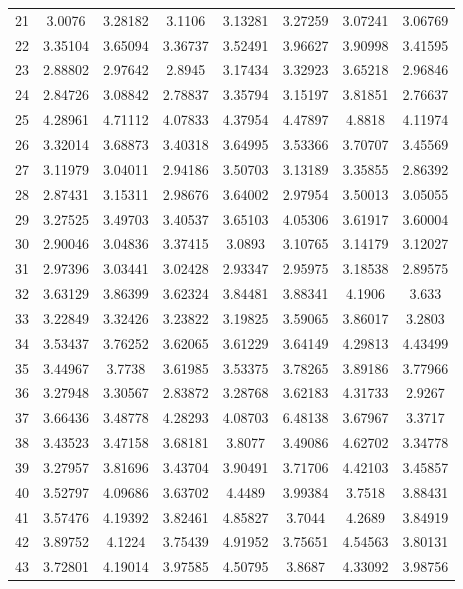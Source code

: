 \begin{figure}
\begin{tabular}{cccccccc}
21 & 3.0076 & 3.28182 & 3.1106 & 3.13281 & 3.27259 & 3.07241 & 3.06769\\
22 & 3.35104 & 3.65094 & 3.36737 & 3.52491 & 3.96627 & 3.90998 & 3.41595\\
23 & 2.88802 & 2.97642 & 2.8945 & 3.17434 & 3.32923 & 3.65218 & 2.96846\\
24 & 2.84726 & 3.08842 & 2.78837 & 3.35794 & 3.15197 & 3.81851 & 2.76637\\
25 & 4.28961 & 4.71112 & 4.07833 & 4.37954 & 4.47897 & 4.8818 & 4.11974\\
26 & 3.32014 & 3.68873 & 3.40318 & 3.64995 & 3.53366 & 3.70707 & 3.45569\\
27 & 3.11979 & 3.04011 & 2.94186 & 3.50703 & 3.13189 & 3.35855 & 2.86392\\
28 & 2.87431 & 3.15311 & 2.98676 & 3.64002 & 2.97954 & 3.50013 & 3.05055\\
29 & 3.27525 & 3.49703 & 3.40537 & 3.65103 & 4.05306 & 3.61917 & 3.60004\\
30 & 2.90046 & 3.04836 & 3.37415 & 3.0893 & 3.10765 & 3.14179 & 3.12027\\
31 & 2.97396 & 3.03441 & 3.02428 & 2.93347 & 2.95975 & 3.18538 & 2.89575\\
32 & 3.63129 & 3.86399 & 3.62324 & 3.84481 & 3.88341 & 4.1906 & 3.633\\
33 & 3.22849 & 3.32426 & 3.23822 & 3.19825 & 3.59065 & 3.86017 & 3.2803\\
34 & 3.53437 & 3.76252 & 3.62065 & 3.61229 & 3.64149 & 4.29813 & 4.43499\\
35 & 3.44967 & 3.7738 & 3.61985 & 3.53375 & 3.78265 & 3.89186 & 3.77966\\
36 & 3.27948 & 3.30567 & 2.83872 & 3.28768 & 3.62183 & 4.31733 & 2.9267\\
37 & 3.66436 & 3.48778 & 4.28293 & 4.08703 & 6.48138 & 3.67967 & 3.3717\\
38 & 3.43523 & 3.47158 & 3.68181 & 3.8077 & 3.49086 & 4.62702 & 3.34778\\
39 & 3.27957 & 3.81696 & 3.43704 & 3.90491 & 3.71706 & 4.42103 & 3.45857\\
40 & 3.52797 & 4.09686 & 3.63702 & 4.4489 & 3.99384 & 3.7518 & 3.88431\\
41 & 3.57476 & 4.19392 & 3.82461 & 4.85827 & 3.7044 & 4.2689 & 3.84919\\
42 & 3.89752 & 4.1224 & 3.75439 & 4.91952 & 3.75651 & 4.54563 & 3.80131\\
43 & 3.72801 & 4.19014 & 3.97585 & 4.50795 & 3.8687 & 4.33092 & 3.98756\\

\end{tabular}
\end{figure}
